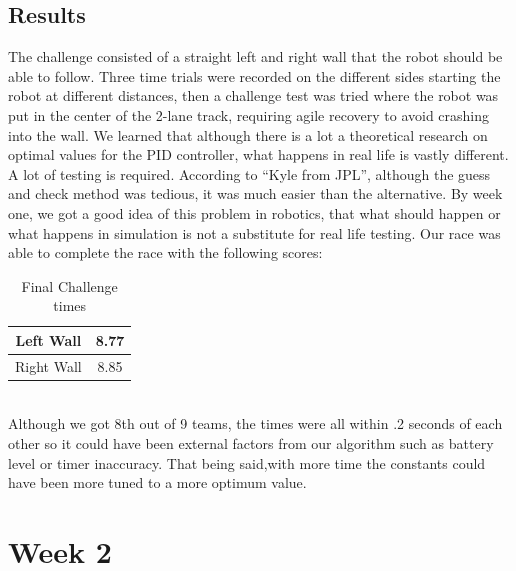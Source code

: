 \documentclass[journal, a4paper]{IEEEtran}
\begin{document}
\subsection{Results}
The challenge consisted of a straight left and right wall that the robot should be able to follow. Three time trials were recorded on the different sides starting the robot at different distances, then a challenge test was tried where the robot was put in the center of the 2-lane track, requiring agile recovery to avoid crashing into the wall. We learned that although there is a lot a theoretical research on optimal values for the PID controller, what happens in real life is vastly different. A lot of testing is required. According to “Kyle from JPL”, although the guess and check method was tedious, it was much easier than the alternative. By week one, we got a good idea of this problem in robotics, that what should happen or what happens in simulation is not a substitute for real life testing. Our race was able to complete the race with the following scores: \\
    \begin{table}[!hbt]
        \begin{center}
        \caption{Final Challenge times}
        \begin{tabular}{|c|c|}
            \hline
            Left Wall & 8.77 \\
            \hline
            Right Wall & 8.85 \\
            \hline
        \end{tabular}
        \end{center}
    \end{table} \\
Although we got 8th out of 9 teams, the times were all within .2 seconds of each other so it could have been external factors from our algorithm such as battery level or timer inaccuracy. That being said,with more time the constants could have been more tuned to a more optimum value. 
\section{Week 2}
\end{document}
